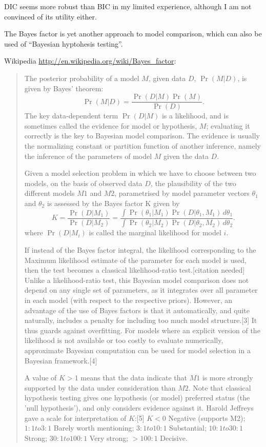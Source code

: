 DIC seems more robust than BIC in my limited experience, although I am
not convinced of its utility either.

The Bayes factor is yet another approach to model comparison, which
can also be used of ``Bayesian hyptohesis testing''.

Wikipedia \url{http://en.wikipedia.org/wiki/Bayes_factor}:
\begin{quote}
The posterior probability of a model $M$, given data $D$, $\Pr(M|D)$, is
given by Bayes' theorem:
\[
    \Pr(M|D) = \frac{\Pr(D|M)\Pr(M)}{\Pr(D)}.
\]
The key data-dependent term $\Pr(D|M)$ is a likelihood, and is sometimes
called the evidence for model or hypothesis, $M$; evaluating it
correctly is the key to Bayesian model comparison. The evidence is
usually the normalizing constant or partition function of another
inference, namely the inference of the parameters of model $M$ given the
data $D$.

Given a model selection problem in which we have to choose between two
models, on the basis of observed data $D$, the plausibility of the two
different models $M1$ and $M2$, parametrised by model parameter vectors $\theta_1$
and $\theta_2$ is assessed by the Bayes factor K given by
\[
    K = \frac{\Pr(D|M_1)}{\Pr(D|M_2)} = \frac{\int
      \Pr(\theta_1|M_1)\Pr(D|\theta_1,M_1)\,d\theta_1} {\int
      \Pr(\theta_2|M_2)\Pr(D|\theta_2,M_2)\,d\theta_2 }. 
\]
where $\Pr(D|M_i)$ is called the marginal likelihood for model $i$.

If instead of the Bayes factor integral, the likelihood corresponding
to the Maximum likelihood estimate of the parameter for each model is
used, then the test becomes a classical likelihood-ratio
test.[citation needed] Unlike a likelihood-ratio test, this Bayesian
model comparison does not depend on any single set of parameters, as
it integrates over all parameter in each model (with respect to the
respective priors). However, an advantage of the use of Bayes factors
is that it automatically, and quite naturally, includes a penalty for
including too much model structure.[3] It thus guards against
overfitting. For models where an explicit version of the likelihood is
not available or too costly to evaluate numerically, approximate
Bayesian computation can be used for model selection in a Bayesian
framework.[4]

A value of $K > 1$ means that the data indicate that $M1$ is more strongly
supported by the data under consideration than $M2$. Note that classical
hypothesis testing gives one hypothesis (or model) preferred status
(the 'null hypothesis'), and only considers evidence against
it. Harold Jeffreys gave a scale for interpretation of $K$:[5]
$K   < 0$  Negative (supports M2); 
$    1:1 to 3:1 $
Barely worth mentioning;
$    3:1 to 10:1 $
    Substantial;
$    10:1 to 30:1 $
        Strong;
$        30:1 to 100:1 $
    Very strong;
$    >100:1 $
    Decisive.
\end{quote}

